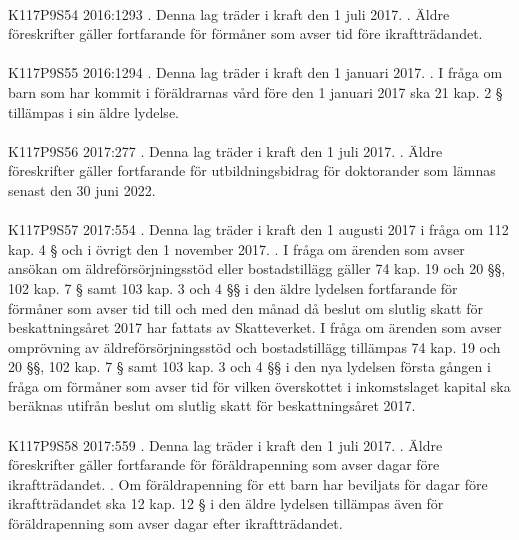 \documentclass[a4paper,notitlepage,openany,10pt]{book}
\begin{document}
\paragraph*{}
{\tiny K117P9S54}
2016:1293
. Denna lag träder i kraft den 1 juli 2017.
. Äldre föreskrifter gäller fortfarande för förmåner som avser tid före ikraftträdandet.
\paragraph*{}
{\tiny K117P9S55}
2016:1294
. Denna lag träder i kraft den 1 januari 2017.
. I fråga om barn som har kommit i föräldrarnas vård före den 1 januari 2017 ska 21 kap. 2 § tillämpas i sin äldre lydelse.
\paragraph*{}
{\tiny K117P9S56}
2017:277
. Denna lag träder i kraft den 1 juli 2017.
. Äldre föreskrifter gäller fortfarande för utbildningsbidrag för doktorander som lämnas senast den 30 juni 2022.
\paragraph*{}
{\tiny K117P9S57}
2017:554
. Denna lag träder i kraft den 1 augusti 2017 i fråga om 112 kap. 4 § och i övrigt den 1 november 2017.
. I fråga om ärenden som avser ansökan om äldreförsörjningsstöd eller bostadstillägg gäller 74 kap. 19 och 20 §§, 102 kap. 7 § samt 103 kap. 3 och 4 §§ i den äldre lydelsen fortfarande för förmåner som avser tid till och med den månad då beslut om slutlig skatt för beskattningsåret 2017 har fattats av Skatteverket. I fråga om ärenden som avser omprövning av äldreförsörjningsstöd och bostadstillägg tillämpas 74 kap. 19 och 20 §§, 102 kap. 7 § samt 103 kap. 3 och 4 §§ i den nya lydelsen första gången i fråga om förmåner som avser tid för vilken överskottet i inkomstslaget kapital ska beräknas utifrån beslut om slutlig skatt för beskattningsåret 2017.
\paragraph*{}
{\tiny K117P9S58}
2017:559
. Denna lag träder i kraft den 1 juli 2017.
. Äldre föreskrifter gäller fortfarande för föräldrapenning som avser dagar före ikraftträdandet.
. Om föräldrapenning för ett barn har beviljats för dagar före ikraftträdandet ska 12 kap. 12 § i den äldre lydelsen tillämpas även för föräldrapenning som avser dagar efter ikraftträdandet.
\end{document}
